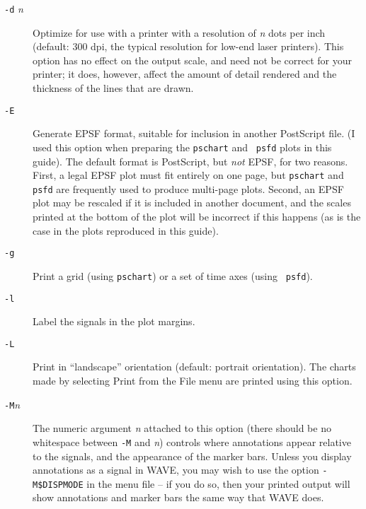 \documentclass[twoside]{book}
\newcommand{\WAVE}{{\sf WAVE}\xspace}
\begin{document}
\begin{description}
\item[{\tt -d} \textit{n}]
Optimize for use with a printer with a resolution of \textit{n} dots
per inch (default: 300 dpi, the typical resolution for low-end laser
printers).  This option has no effect on the output scale, and need
not be correct for your printer;  it does, however, affect the amount
of detail rendered and the thickness of the lines that are drawn.

\item[{\tt -E}]
Generate EPSF format, suitable for inclusion in another PostScript
file.  (I used this option when preparing the {\tt pschart} and {\tt
psfd} plots in this guide).  The default format is PostScript, but
\emph{not} EPSF, for two reasons.  First, a legal EPSF plot must fit
entirely on one page, but {\tt pschart} and {\tt psfd} are frequently
used to produce multi-page plots.  Second, an EPSF plot may be
rescaled if it is included in another document, and the scales printed
at the bottom of the plot will be incorrect if this happens (as is the
case in the plots reproduced in this guide).

\item[{\tt -g}]
Print a grid (using {\tt pschart}) or a set of time axes (using {\tt
psfd}).

\item[{\tt -l}]
Label the signals in the plot margins.

\item[{\tt -L}]
Print in ``landscape'' orientation (default: portrait orientation).
The charts made by selecting {\sf Print} from the {\sf File} menu are
printed using this option.

\item[{\tt -M}\textit{n}]
The numeric argument \textit{n} attached to this option (there should
be no whitespace between {\tt -M} and \textit{n}) controls where
annotations appear relative to the signals, and the appearance of the
marker bars.  Unless you display annotations as a signal in \WAVE{}, you
may wish to use the option {\tt -M\$DISPMODE} in the menu file --
if you do so, then your printed output will show annotations and
marker bars the same way that \WAVE{} does.


\end{description}
\end{document}
